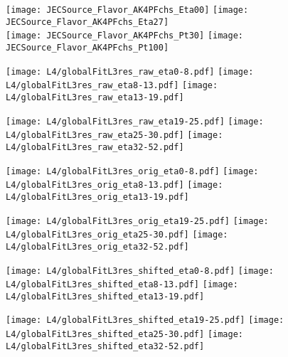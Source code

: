 \documentclass[landscape,10pt]{beamer} %
\begin{document}
{\newpage
\begin{figure}[p]
\centering
\texttt{[image: JECSource\_Flavor\_AK4PFchs\_Eta00]}
\texttt{[image: JECSource\_Flavor\_AK4PFchs\_Eta27]}\\
\texttt{[image: JECSource\_Flavor\_AK4PFchs\_Pt30]}
\texttt{[image: JECSource\_Flavor\_AK4PFchs\_Pt100]}
\end{figure}

\newpage

\begin{figure}[p]
\centering
  \texttt{[image: L4/globalFitL3res\_raw\_eta0-8.pdf]}
  \texttt{[image: L4/globalFitL3res\_raw\_eta8-13.pdf]}
  \texttt{[image: L4/globalFitL3res\_raw\_eta13-19.pdf]}
\end{figure}
\begin{figure}[p]
\centering
  \texttt{[image: L4/globalFitL3res\_raw\_eta19-25.pdf]}
  \texttt{[image: L4/globalFitL3res\_raw\_eta25-30.pdf]}
  \texttt{[image: L4/globalFitL3res\_raw\_eta32-52.pdf]}
\end{figure}

\newpage

\begin{figure}[p]
\centering
  \texttt{[image: L4/globalFitL3res\_orig\_eta0-8.pdf]}
  \texttt{[image: L4/globalFitL3res\_orig\_eta8-13.pdf]}
  \texttt{[image: L4/globalFitL3res\_orig\_eta13-19.pdf]}
\end{figure}
\begin{figure}[p]
\centering
  \texttt{[image: L4/globalFitL3res\_orig\_eta19-25.pdf]}
  \texttt{[image: L4/globalFitL3res\_orig\_eta25-30.pdf]}
  \texttt{[image: L4/globalFitL3res\_orig\_eta32-52.pdf]}
\end{figure}

\newpage

\begin{figure}[p]
\centering
  \texttt{[image: L4/globalFitL3res\_shifted\_eta0-8.pdf]}
  \texttt{[image: L4/globalFitL3res\_shifted\_eta8-13.pdf]}
  \texttt{[image: L4/globalFitL3res\_shifted\_eta13-19.pdf]}
\end{figure}
\begin{figure}[p]
\centering
  \texttt{[image: L4/globalFitL3res\_shifted\_eta19-25.pdf]}
  \texttt{[image: L4/globalFitL3res\_shifted\_eta25-30.pdf]}
  \texttt{[image: L4/globalFitL3res\_shifted\_eta32-52.pdf]}
\end{figure}

}
\end{document}
